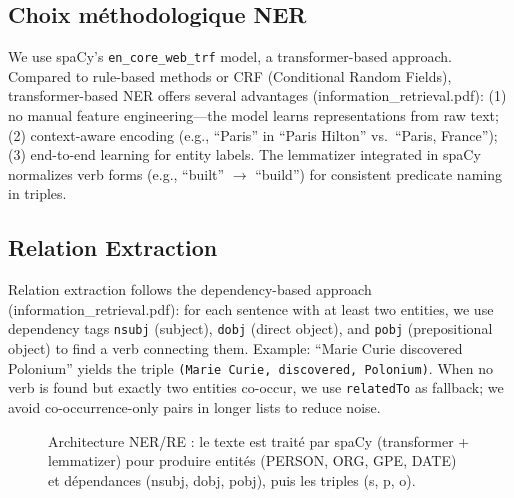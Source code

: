 \documentclass[11pt,a4paper]{article}
\begin{document}
  \subsection{Choix méthodologique NER}

  We use spaCy's \texttt{en\_core\_web\_trf} model, a transformer-based approach. Compared to rule-based methods or CRF (Conditional Random Fields), transformer-based NER offers several advantages (information\_retrieval.pdf): (1) no manual feature engineering---the model learns representations from raw text; (2) context-aware encoding (e.g., ``Paris'' in ``Paris Hilton'' vs.\ ``Paris, France''); (3) end-to-end learning for entity labels. The lemmatizer integrated in spaCy normalizes verb forms (e.g., ``built'' $\rightarrow$ ``build'') for consistent predicate naming in triples.

  \subsection{Relation Extraction}

  Relation extraction follows the dependency-based approach (information\_retrieval.pdf): for each sentence with at least two entities, we use dependency tags \texttt{nsubj} (subject), \texttt{dobj} (direct object), and \texttt{pobj} (prepositional object) to find a verb connecting them. Example: ``Marie Curie discovered Polonium'' yields the triple \texttt{(Marie Curie, discovered, Polonium)}. When no verb is found but exactly two entities co-occur, we use \texttt{relatedTo} as fallback; we avoid co-occurrence-only pairs in longer lists to reduce noise.

  \begin{figure}[ht]
  \centering
  \caption{Architecture NER/RE : le texte est traité par spaCy (transformer + lemmatizer) pour produire entités (PERSON, ORG, GPE, DATE) et dépendances (nsubj, dobj, pobj), puis les triples (s, p, o).}
  \end{figure}
\end{document}
